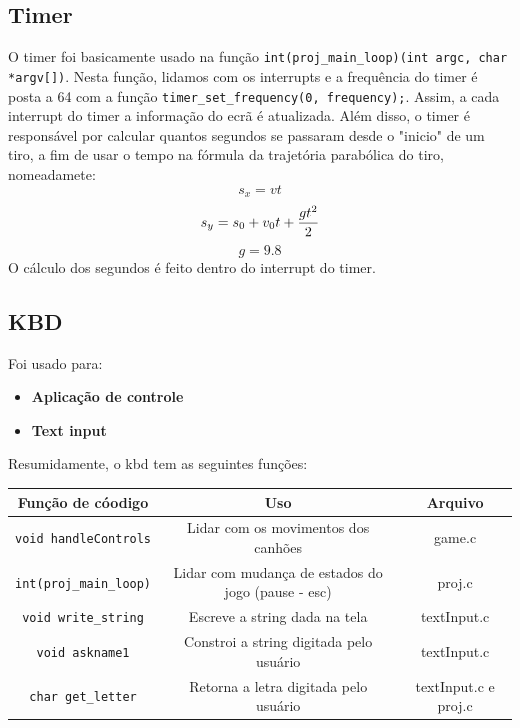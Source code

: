 \documentclass[12pt]{article}
\begin{document}
\subsection{Timer}
O timer foi basicamente usado na função \texttt{{\color{blue}int(proj\_main\_loop)(int argc, char *argv[])}}. 
Nesta função, lidamos com os interrupts e a frequência do timer é posta a 64 com a função 
\texttt{{\color{blue}timer\_set\_frequency(0, frequency);}}. \newline
Assim, a cada interrupt do timer a informação do ecrã é atualizada.\newline
Além disso, o timer é responsável por calcular quantos segundos se passaram desde o "inicio" de um tiro, a fim de usar o tempo
na fórmula da trajetória parabólica do tiro, nomeadamete: \newline
$$ s_{x} = vt$$ 
$$s_{y} = s_0+v_0t+\frac{gt^2}{2} \space\space$$ 
$$ g = 9.8$$
O cálculo dos segundos é feito dentro do interrupt do timer. 
\subsection{KBD}
Foi usado para: 
\begin{itemize}
    \item \textbf{Aplicação de controle}
    \item \textbf{Text input}
\end{itemize}
Resumidamente, o kbd tem as seguintes funções: 
\newline
\begin{center}
    \begin{tabular}{|c|c|c|}
        \hline
        Função de cóodigo & Uso & Arquivo\\
        \hline
        \texttt{void handleControls} & Lidar com os movimentos dos canhões & game.c  \\
        \texttt{int(proj\_main\_loop)} & Lidar com mudança de estados do jogo (pause - esc) & proj.c \\
        \texttt{void write\_string} & Escreve a string dada na tela & textInput.c \\ 
        \texttt{void askname1} & Constroi a string digitada pelo usuário & textInput.c \\
        \texttt{char get\_letter} & Retorna a letra digitada pelo usuário & textInput.c e proj.c \\  
        \hline
    \end{tabular}
\end{center}
\newpage
\end{document}
